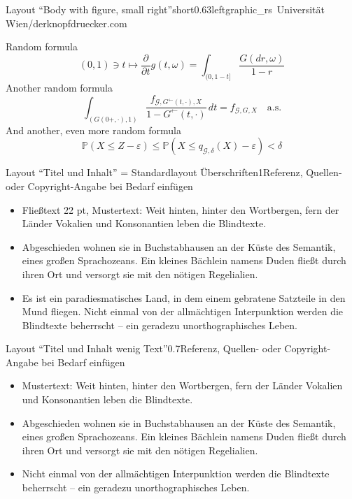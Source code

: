 \documentclass[hyperref={pdfpagelabels=false}, aspectratio=43, t]{beamer}  %
\begin{document}
\iffalse
\begin{graphicsFrame}{Layout ``Body with figure, small right''}{short}{0.63}{left}{graphic_rs}{\textcopyright~Universität Wien/derknopfdruecker.com}

		Random formula
		\[
			(0,1)\ni t\mapsto\frac{\partial}{\partial t} g(t,\omega)=\int_{( 0,1-t]}\frac{G(dr,\omega)}{1-r}
		\]
		Another random formula
		\begin{equation}\label{eq1}
			\int_{( G(0+,\cdot),1)}\frac{ f_{\mathcal{G},G^{\leftarrow}(t,\cdot),X}}{1-G^{\leftarrow}(t,\cdot)}\,dt
			= f_{\mathcal{G},G,X}\quad \textrm{a.s.}
		\end{equation}
		And another, even more random formula
		\[
			\mathbb{P}(X\leq Z-\varepsilon)\leq
			\mathbb{P}(X\leq q_{\mathcal{G},\delta}(X)-\varepsilon )< \delta
		\]

\end{graphicsFrame}
													

\begin{textFrame}{Layout ``Titel und Inhalt'' = Standardlayout Überschriften}{1}{Referenz, Quellen- oder Copyright-Angabe bei Bedarf einfügen}

	\begin{itemize}
		\item Fließtext 22 pt, Mustertext: Weit hinten, hinter den Wortbergen, fern der Länder Vokalien und Konsonantien leben die Blindtexte.
		\item Abgeschieden wohnen sie in Buchstabhausen an der Küste des Semantik, eines großen Sprachozeans. Ein kleines Bächlein namens Duden fließt durch ihren Ort und versorgt sie mit den nötigen Regelialien.
		\item Es ist ein paradiesmatisches Land, in dem einem gebratene Satzteile in den Mund fliegen. Nicht einmal von der allmächtigen Interpunktion werden die Blindtexte beherrscht – ein geradezu unorthographisches Leben.

	\end{itemize}
\end{textFrame}

\begin{textFrame}{Layout ``Titel und Inhalt wenig Text''}{0.7}{Referenz, Quellen- oder Copyright-Angabe bei Bedarf einfügen}

	\begin{itemize}
		\item Mustertext: Weit hinten, hinter den Wortbergen, fern der Länder Vokalien und Konsonantien leben die Blindtexte.
		\item Abgeschieden wohnen sie in Buchstabhausen an der Küste des Semantik, eines großen Sprachozeans. Ein kleines Bächlein namens Duden fließt durch ihren Ort und versorgt sie mit den nötigen Regelialien.
		\item Nicht einmal von der allmächtigen Interpunktion werden die Blindtexte beherrscht – ein geradezu unorthographisches Leben.
	\end{itemize}
\end{textFrame}
\end{document}
